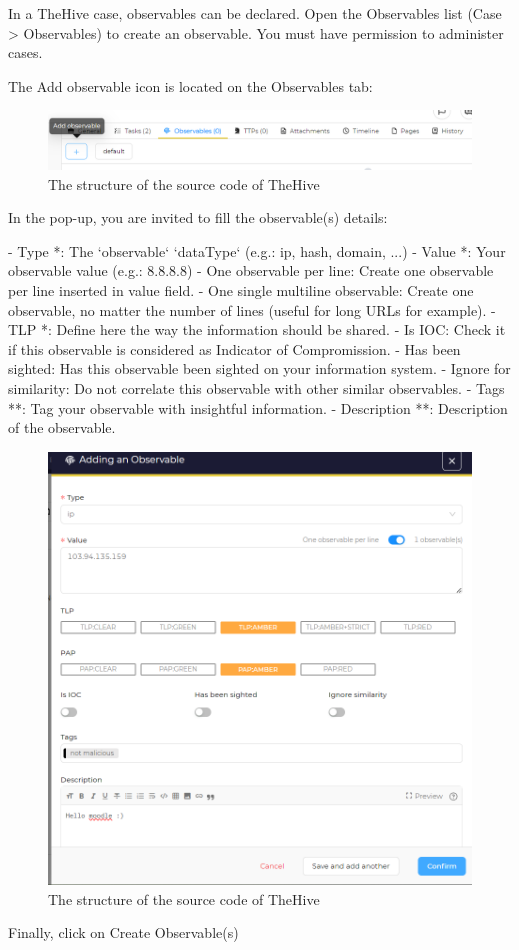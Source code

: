 In a TheHive case, observables can be declared.
Open the Observables list (Case > Observables) to create an observable. You must have permission to administer cases.

The Add observable icon is located on the Observables tab:

\begin{figure}[h]
    \centering
    \includegraphics[width=\textwidth]{images/docs/analyst/observable/create-observable-button.png}
    \caption{The structure of the source code of TheHive}
    \label{fig:create-observable-button}
\end{figure}

In the pop-up, you are invited to fill the observable(s) details:
\begin{markdown}
- Type *: The `observable` `dataType` (e.g.: ip, hash, domain, ...)
- Value *: Your observable value (e.g.: 8.8.8.8)
    - One observable per line: Create one observable per line inserted in value field.
    - One single multiline observable: Create one observable, no matter the number of lines (useful for long URLs for example).
- TLP *: Define here the way the information should be shared.
- Is IOC: Check it if this observable is considered as Indicator of Compromission.
- Has been sighted: Has this observable been sighted on your information system.
- Ignore for similarity: Do not correlate this observable with other similar observables.
- Tags **: Tag your observable with insightful information.
- Description **: Description of the observable.
\end{markdown}

\begin{figure}[h!]
    \centering
    \includegraphics[width=\textwidth]{images/docs/analyst/observable/create-observable.png}
    \caption{The structure of the source code of TheHive}
    \label{fig:create-observable}
\end{figure}

Finally, click on Create Observable(s)